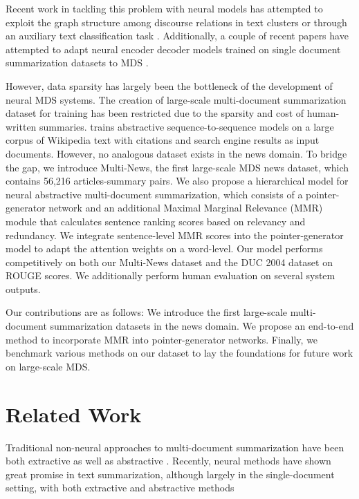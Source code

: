 \documentclass[11pt,a4paper]{article}
\begin{document}
Recent work in tackling this problem with neural models has attempted to exploit the graph structure among discourse relations in text clusters \cite{yasunaga17graph} or through an auxiliary text classification task \cite{17classification}. Additionally, a couple of recent papers have attempted to adapt neural encoder decoder models trained on single document summarization datasets to MDS \cite{lebanoff18mds,baumel18mds, Zhang:18}.

However, data sparsity has largely been the bottleneck of the development of neural MDS systems.  The creation of large-scale multi-document summarization dataset for training has been restricted due to the sparsity and cost of human-written summaries.  trains abstractive sequence-to-sequence models on a large corpus of Wikipedia text with citations and search engine results as input documents. However, no analogous dataset exists in the news domain.  To bridge the gap, we introduce Multi-News, the first large-scale MDS news dataset, which contains 56,216 articles-summary pairs. We also propose a hierarchical model for neural abstractive multi-document summarization, which consists of a pointer-generator network \cite{see2017ptr_gen} and an additional Maximal Marginal Relevance (MMR) \cite{carbonell1998use} module that calculates sentence ranking scores based on relevancy and redundancy. We integrate sentence-level MMR scores into the pointer-generator model to adapt the attention weights on a word-level. Our model performs competitively on both our Multi-News dataset and the DUC 2004 dataset on ROUGE scores. We additionally perform human evaluation on several system outputs.

Our contributions are as follows: We introduce the first large-scale multi-document summarization datasets in the news domain. We propose an end-to-end method to incorporate MMR into pointer-generator networks. Finally, we benchmark various methods on our dataset to lay the foundations for future work on large-scale MDS. 



\section{Related Work}
Traditional non-neural approaches to multi-document summarization have been both extractive \cite{carbonell1998use, radev00centroid, erkan2004lexrank, mihalcea2004textrank, haghighi09content} as well as abstractive \cite{McKeown&Radev95, radev98mds, barzilay99fusion, ganesan10opinosis}. 
Recently, neural methods have shown great promise in text summarization, although largely in the single-document setting, with both extractive \cite{nallapai16b, cheng16ext, narayan18rl} and abstractive methods \cite{chopra16og, nallapati16a, see2017ptr_gen, paulus17rl, cohan18discourse, celikyilmaz18rl, Gehrmann:18}
\end{document}

